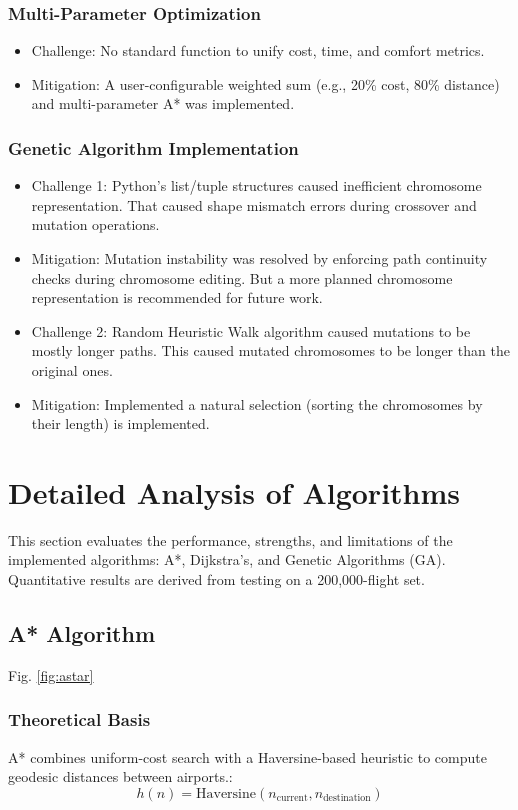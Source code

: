 \documentclass[conference]{IEEEtran}
\begin{document}
\subsubsection{Multi-Parameter Optimization}
\begin{itemize}
    \item Challenge: No standard function to unify cost, time, and comfort metrics. 
    \item Mitigation: A user-configurable weighted sum (e.g., 20\% cost, 80\% distance) and multi-parameter A* was implemented. 
\end{itemize}

\subsubsection{Genetic Algorithm Implementation}
\begin{itemize}
    \item Challenge 1: Python's list/tuple structures caused inefficient chromosome representation. That caused shape mismatch errors during crossover and mutation operations.
    \item Mitigation: Mutation instability was resolved by enforcing path continuity checks during chromosome editing. But a more planned chromosome representation is recommended for future work.
    
    \item Challenge 2: Random Heuristic Walk algorithm caused mutations to be mostly longer paths. This caused mutated chromosomes to be longer than the original ones. 
    \item Mitigation: Implemented a natural selection (sorting the chromosomes by their length) is implemented.
\end{itemize}



\section{Detailed Analysis of Algorithms}
This section evaluates the performance, strengths, and limitations of the implemented algorithms: A*, Dijkstra's, and Genetic Algorithms (GA). 
Quantitative results are derived from testing on a 200,000-flight set.


\subsection{A* Algorithm}
Fig. \ref{fig:astar}
\subsubsection{Theoretical Basis}
A* combines uniform-cost search with a Haversine-based heuristic to compute geodesic distances between airports.:
\[
h(n) = \text{Haversine}(n_{\text{current}}, n_{\text{destination}})
\]
\end{document}

